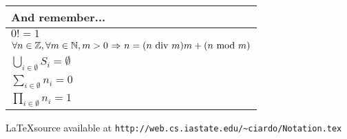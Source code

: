 \documentclass[11pt]{article}
\newcommand{\Naturals}{\mathbb{N}}   %
\newcommand{\Integers}{\mathbb{Z}}   %
\newcommand{\THEN}{\mbox{$\Rightarrow$}}           %
\begin{document}
\begin{tabular}{|l|}
\multicolumn{1}{l}{\bf And remember...}
\\ \hline
$0! = 1$
\\ \hline
$\forall n \in \Integers, \forall m \in \Naturals, m > 0 ~\THEN~ n =
  (n ~{\rm div}~ m)m + (n ~{\rm mod}~ m)$
\\ \hline
$\bigcup_{i \in \emptyset} S_i = \emptyset$
\\ \hline
$\sum_{i \in \emptyset} n_i = 0$
\\ \hline
$\prod_{i \in \emptyset} n_i = 1$
\\ \hline
\end{tabular}

\vfill

\LaTeX source available at
\verb+http://web.cs.iastate.edu/~ciardo/Notation.tex+
\end{document}
